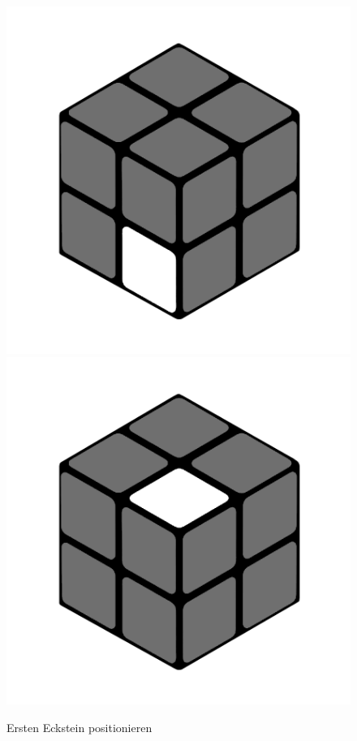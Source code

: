 \documentclass[12pt,a4paper, usenames, dvipsnames]{article}
\theoremstyle{mystyle}
\theoremstyle{definition}
\begin{document}
\begin{figure}[H]
\centering
\includegraphics[scale=0.1]{e1_s1_s1.png}
\includegraphics[scale=0.1]{e1_s1_s2.png}
\caption{Ersten Eckstein positionieren}
\label{Abbildung_ErsterEckstein}
\end{figure}
\end{document}
